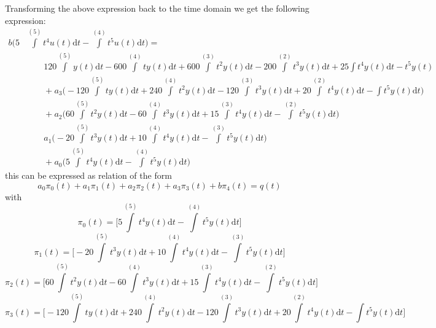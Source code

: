 \documentclass[letterpaper%
, twoside%
, 12pt%
,memoire%
, english%
,creativecommons,hyperref%
]{thETS}
\theoremstyle{newThmStyle}
\begin{document}
Transforming the above expression back to the time domain we get the following expression:
\begin{equation}\label{eqn.34}
\begin{split}
b\big(5 &\int\limits^{(5)} t^4 u(t) \mathrm{d}t - \int\limits^{(4)} t^5 u(t) \mathrm{d}t\big) =\\
&\qquad{}120\int\limits^{(5)}y(t) \mathrm{d}t - 600\int\limits^{(4)}ty(t)\mathrm{d}t + 600\int\limits^{(3)}t^2y(t)\mathrm{d}t - 200\int\limits^{(2)}t^3y(t)\mathrm{d}t + 25\int t^4y(t)\mathrm{d}t- t^5y(t)  \, \\
&\qquad{}+ a_{3}\bigg(-120\int\limits^{(5)}ty(t) \mathrm{d}t + 240\int\limits^{(4)}t^2y(t)\mathrm{d}t - 120\int\limits^{(3)}t^3y(t)\mathrm{d}t + 20\int\limits^{(2)}t^4y(t)\mathrm{d}t - \int t^5y(t)\mathrm{d}t\bigg)  \, \\ 
&\qquad{}+ a_{2}\bigg(60\int\limits^{(5)}t^2y(t) \mathrm{d}t - 60\int\limits^{(4)}t^3y(t)\mathrm{d}t + 15\int\limits^{(3)}t^4y(t)\mathrm{d}t - \int\limits^{(2)} t^5y(t)\mathrm{d}t \bigg)  \, \\
&\qquad{} a_{1}\bigg(-20\int\limits^{(5)}t^3y(t) \mathrm{d}t + 10\int\limits^{(4)}t^4y(t)\mathrm{d}t - \int\limits^{(3)}t^5y(t)\mathrm{d}t \bigg)  \, \\
&\qquad{}+ a_{0}\bigg(5\int\limits^{(5)}t^4y(t) \mathrm{d}t - \int\limits^{(4)}t^5y(t)\mathrm{d}t \bigg)
\end{split}
\end{equation}
this can be expressed as relation of the form
\begin{equation}\label{eqn.35}
a_{0}\pi_{0}(t) + a_{1}\pi_{1}(t) + a_{2}\pi_{2}(t) + a_{3}\pi_{3}(t) + b\pi_{4}(t) = q(t)
\end{equation}
with
\begin{equation*}
\pi_{0}(t) = \bigg[5\int\limits^{(5)}t^4y(t) \mathrm{d}t - \int\limits^{(4)}t^5y(t)\mathrm{d}t\bigg]
\end{equation*}
\begin{equation*}
\pi_{1}(t) = \bigg[-20\int\limits^{(5)}t^3y(t) \mathrm{d}t + 10\int\limits^{(4)}t^4y(t)\mathrm{d}t - \int\limits^{(3)}t^5y(t)\mathrm{d}t\bigg]
\end{equation*}
\begin{equation*}
\pi_{2} (t) = \bigg[60\int\limits^{(5)}t^2y(t) \mathrm{d}t - 60\int\limits^{(4)}t^3y(t)\mathrm{d}t + 15\int\limits^{(3)}t^4y(t)\mathrm{d}t - \int\limits^{(2)} t^5y(t)\mathrm{d}t \bigg]
\end{equation*}
\begin{equation*}
\pi_{3}(t) = \bigg[-120\int\limits^{(5)}ty(t) \mathrm{d}t + 240\int\limits^{(4)}t^2y(t)\mathrm{d}t - 120\int\limits^{(3)}t^3y(t)\mathrm{d}t + 20\int\limits^{(2)}t^4y(t)\mathrm{d}t - \int t^5y(t)\mathrm{d}t \bigg]
\end{equation*}
\end{document}
